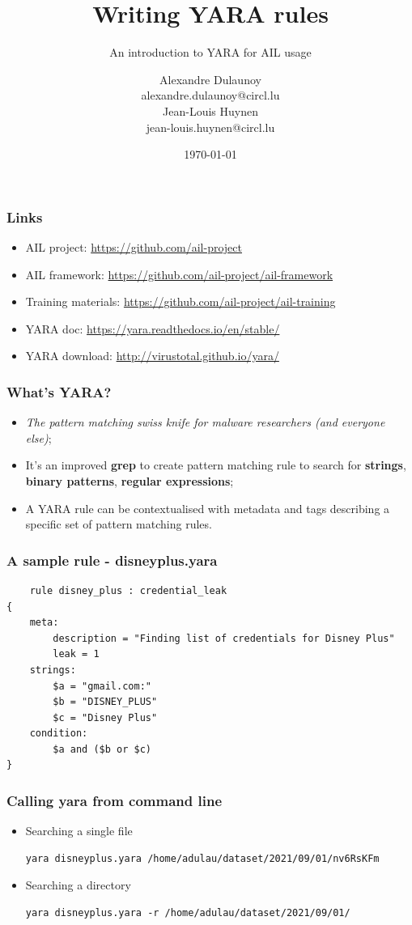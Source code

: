 \documentclass{beamer}
\author{\large{Alexandre Dulaunoy}\\ \scriptsize{alexandre.dulaunoy@circl.lu}\\ \large{Jean-Louis Huynen}\\ \scriptsize{jean-louis.huynen@circl.lu}\\}
\title{Writing YARA rules}
\subtitle{An introduction to YARA for AIL usage}
\institute{info@circl.lu}
\date{\today}
\begin{document}
\begin{frame}[t,plain]
\titlepage
\end{frame}

\begin{frame}
\frametitle{Links}
    \begin{itemize}
        \item AIL project: \url{https://github.com/ail-project}
        \item AIL framework: \url{https://github.com/ail-project/ail-framework}
        \item Training materials: \url{https://github.com/ail-project/ail-training}
	\item YARA doc: \url{https://yara.readthedocs.io/en/stable/} 
	\item YARA download:  \url{http://virustotal.github.io/yara/}
    \end{itemize}
\end{frame}

\begin{frame}[fragile]
\frametitle{What's YARA?}
	\begin{itemize}
	\item {\it The pattern matching swiss knife for malware researchers (and everyone else)};
	\item It's an improved {\bf grep} to create pattern matching rule to search for {\bf strings}, {\bf binary patterns}, {\bf regular expressions};
	\item A YARA rule can be contextualised with metadata and tags describing a specific set of pattern matching rules.
	\end{itemize}
\end{frame}

\lstset{language=Python}
\begin{frame}[fragile]
\frametitle{A sample rule - disneyplus.yara}
	\begin{lstlisting}
	rule disney_plus : credential_leak 
{
    meta:                                        
        description = "Finding list of credentials for Disney Plus"
        leak = 1
    strings: 
        $a = "gmail.com:"
        $b = "DISNEY_PLUS"
        $c = "Disney Plus"
    condition:
        $a and ($b or $c) 
}
	\end{lstlisting}
\end{frame}


\lstset{language=sh}
\begin{frame}[fragile]
\frametitle{Calling yara from command line}
	\begin{itemize}
	\item Searching a single file
	\begin{lstlisting}
yara disneyplus.yara /home/adulau/dataset/2021/09/01/nv6RsKFm
	\end{lstlisting}
	\item Searching a directory
	\begin{lstlisting}
yara disneyplus.yara -r /home/adulau/dataset/2021/09/01/
	\end{lstlisting}
	\end{itemize}
\end{frame}
\end{document}
